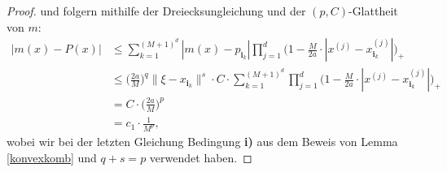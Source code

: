 \begin{proof}
und folgern mithilfe der Dreiecksungleichung und der $(p,C)$-Glattheit von $m\colon$
\begin{equation*}
\begin{split}
|m(x) - P(x)| & \leq \sum_{k = 1}^{(M + 1)^d} |m(x) - p_{\mathbf{i}_k}| \prod_{j = 1}^d \bigg(1 - \frac{M}{2a} \cdot |x^{(j)} - x_{\mathbf{i}_k}^{(j)}|\bigg)_+ \\
& \leq \bigg(\frac{2a}{M}\bigg)^q \|\xi - x_{\mathbf{i}_k}\|^s \cdot C \cdot \sum_{k = 1}^{(M + 1)^d} \prod_{j = 1}^d \bigg(1 - \frac{M}{2a} \cdot |x^{(j)} - x_{\mathbf{i}_k}^{(j)}|\bigg)_+ \\
& = C \cdot \bigg(\frac{2a}{M}\bigg)^p \\
& = c_1 \cdot \frac{1}{M^p},
\end{split}
\end{equation*}
wobei wir bei der letzten Gleichung  Bedingung \textbf{i)} aus dem Beweis von Lemma \ref{konvexkomb} und $q + s = p$ verwendet haben.
\end{proof}

